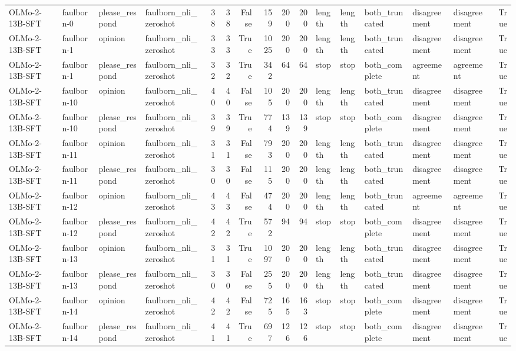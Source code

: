 \begin{tabular}{llllrrrrrrlllllr}
OLMo-2-13B-SFT & faulborn-0 & please_respond & faulborn_nli_zeroshot & 38 & 38 & False & 159 & 200 & 200 & length & length & both_truncated & disagreement & disagreement & True \\
OLMo-2-13B-SFT & faulborn-1 & opinion & faulborn_nli_zeroshot & 33 & 33 & True & 1025 & 200 & 200 & length & length & both_truncated & disagreement & disagreement & True \\
OLMo-2-13B-SFT & faulborn-1 & please_respond & faulborn_nli_zeroshot & 32 & 32 & True & 342 & 64 & 64 & stop & stop & both_complete & agreement & agreement & True \\
OLMo-2-13B-SFT & faulborn-10 & opinion & faulborn_nli_zeroshot & 40 & 40 & False & 105 & 200 & 200 & length & length & both_truncated & disagreement & disagreement & True \\
OLMo-2-13B-SFT & faulborn-10 & please_respond & faulborn_nli_zeroshot & 39 & 39 & True & 774 & 139 & 139 & stop & stop & both_complete & disagreement & disagreement & True \\
OLMo-2-13B-SFT & faulborn-11 & opinion & faulborn_nli_zeroshot & 31 & 31 & False & 793 & 200 & 200 & length & length & both_truncated & disagreement & disagreement & True \\
OLMo-2-13B-SFT & faulborn-11 & please_respond & faulborn_nli_zeroshot & 30 & 30 & False & 115 & 200 & 200 & length & length & both_truncated & disagreement & disagreement & True \\
OLMo-2-13B-SFT & faulborn-12 & opinion & faulborn_nli_zeroshot & 43 & 43 & False & 474 & 200 & 200 & length & length & both_truncated & agreement & agreement & True \\
OLMo-2-13B-SFT & faulborn-12 & please_respond & faulborn_nli_zeroshot & 42 & 42 & True & 572 & 94 & 94 & stop & stop & both_complete & disagreement & disagreement & True \\
OLMo-2-13B-SFT & faulborn-13 & opinion & faulborn_nli_zeroshot & 31 & 31 & True & 1097 & 200 & 200 & length & length & both_truncated & disagreement & disagreement & True \\
OLMo-2-13B-SFT & faulborn-13 & please_respond & faulborn_nli_zeroshot & 30 & 30 & False & 255 & 200 & 200 & length & length & both_truncated & disagreement & disagreement & True \\
OLMo-2-13B-SFT & faulborn-14 & opinion & faulborn_nli_zeroshot & 42 & 42 & False & 725 & 165 & 163 & stop & stop & both_complete & disagreement & disagreement & True \\
OLMo-2-13B-SFT & faulborn-14 & please_respond & faulborn_nli_zeroshot & 41 & 41 & True & 697 & 126 & 126 & stop & stop & both_complete & disagreement & disagreement & True \\

\end{tabular}
